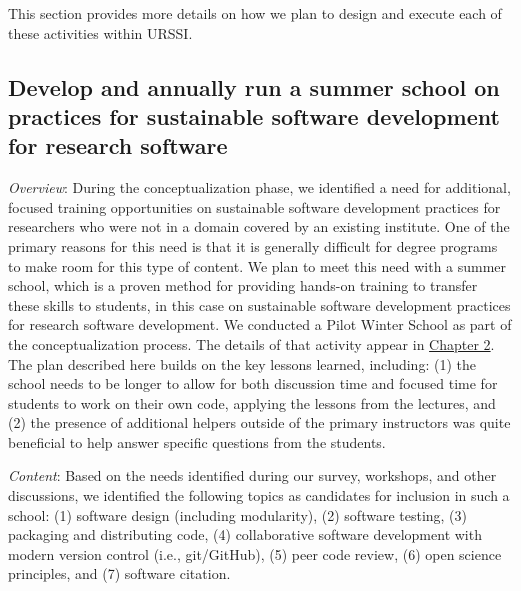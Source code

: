 \documentclass[
]{book}
\begin{document}
This section provides more details on how we plan to design and execute each of these
activities within URSSI.

\hypertarget{develop-and-annually-run-a-summer-school-on-practices-for-sustainable-software-development-for-research-software}{%
\subsection{Develop and annually run a summer school on practices for sustainable software development for research software}\label{develop-and-annually-run-a-summer-school-on-practices-for-sustainable-software-development-for-research-software}}

\emph{Overview}: During the conceptualization phase, we identified a need for additional,
focused training opportunities on sustainable software development practices for researchers
who were not in a domain covered by an existing institute. One of the primary reasons for
this need is that it is generally difficult for degree programs to make room for this type of
content. We plan to meet this need with a summer school, which is a proven method for
providing hands-on training to transfer these skills to students, in this case on sustainable
software development practices for research software development. We conducted a Pilot
Winter School as part of the conceptualization process. The details of that activity appear
in \protect\hyperlink{chapter2-WinterSchool}{Chapter 2}. The plan described here builds on the key lessons
learned, including: (1) the school needs to be longer to allow for both discussion time
and focused time for students to work on their own code, applying the lessons from the
lectures, and (2) the presence of additional helpers outside of the primary instructors
was quite beneficial to help answer specific questions from the students.

\emph{Content}: Based on the needs identified during our survey, workshops, and other discussions,
we identified the following topics as candidates for inclusion in such a school:
(1) software design (including modularity), (2) software testing,
(3) packaging and distributing code,
(4) collaborative software development with modern version control (i.e., git/GitHub),
(5) peer code review, (6) open science principles, and (7) software citation.
\end{document}
